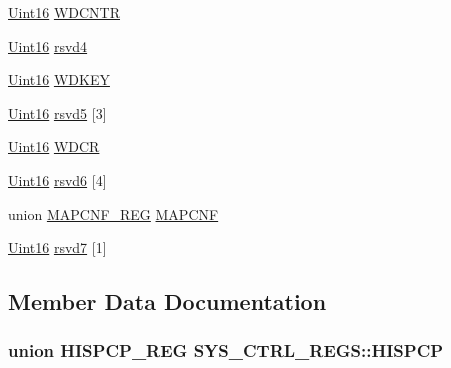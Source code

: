 \begin{DoxyCompactItemize}
\item 
\hyperlink{_d_s_p2833x___device_8h_a59a9f6be4562c327cbfb4f7e8e18f08b}{Uint16} \hyperlink{struct_s_y_s___c_t_r_l___r_e_g_s_a92b24af23d12a6923e477f4468b839e2}{W\+D\+C\+N\+T\+R}
\item 
\hyperlink{_d_s_p2833x___device_8h_a59a9f6be4562c327cbfb4f7e8e18f08b}{Uint16} \hyperlink{struct_s_y_s___c_t_r_l___r_e_g_s_a770233f4e7f0eccd807279b48cb9d76d}{rsvd4}
\item 
\hyperlink{_d_s_p2833x___device_8h_a59a9f6be4562c327cbfb4f7e8e18f08b}{Uint16} \hyperlink{struct_s_y_s___c_t_r_l___r_e_g_s_a1ed06323c33e1bba4a06aaf56186286a}{W\+D\+K\+E\+Y}
\item 
\hyperlink{_d_s_p2833x___device_8h_a59a9f6be4562c327cbfb4f7e8e18f08b}{Uint16} \hyperlink{struct_s_y_s___c_t_r_l___r_e_g_s_ae438ddfe18c07ff891b7738a40b2d0e6}{rsvd5} \mbox{[}3\mbox{]}
\item 
\hyperlink{_d_s_p2833x___device_8h_a59a9f6be4562c327cbfb4f7e8e18f08b}{Uint16} \hyperlink{struct_s_y_s___c_t_r_l___r_e_g_s_a3ceb4cad7e7068a2872a2d50c647745c}{W\+D\+C\+R}
\item 
\hyperlink{_d_s_p2833x___device_8h_a59a9f6be4562c327cbfb4f7e8e18f08b}{Uint16} \hyperlink{struct_s_y_s___c_t_r_l___r_e_g_s_a6c5beb5604e054de5266b9a46b4f4cdd}{rsvd6} \mbox{[}4\mbox{]}
\item 
union \hyperlink{union_m_a_p_c_n_f___r_e_g}{M\+A\+P\+C\+N\+F\+\_\+\+R\+E\+G} \hyperlink{struct_s_y_s___c_t_r_l___r_e_g_s_a2ffb7adf4b4e29fe0ab20938d9ea720a}{M\+A\+P\+C\+N\+F}
\item 
\hyperlink{_d_s_p2833x___device_8h_a59a9f6be4562c327cbfb4f7e8e18f08b}{Uint16} \hyperlink{struct_s_y_s___c_t_r_l___r_e_g_s_a52407a458b1255b66c8b2dc225c32b0f}{rsvd7} \mbox{[}1\mbox{]}
\end{DoxyCompactItemize}


\subsection{Member Data Documentation}
\hypertarget{struct_s_y_s___c_t_r_l___r_e_g_s_ad42d708dd4d801d6e2d4e500f40203c1}{}
\subsubsection[{H\+I\+S\+P\+C\+P}]{\setlength{\rightskip}{0pt plus 5cm}union {\bf H\+I\+S\+P\+C\+P\+\_\+\+R\+E\+G} S\+Y\+S\+\_\+\+C\+T\+R\+L\+\_\+\+R\+E\+G\+S\+::\+H\+I\+S\+P\+C\+P}\label{struct_s_y_s___c_t_r_l___r_e_g_s_ad42d708dd4d801d6e2d4e500f40203c1}
\hypertarget{struct_s_y_s___c_t_r_l___r_e_g_s_a47d376515ad8d8ea6ca56e9a01f967ba}{}
